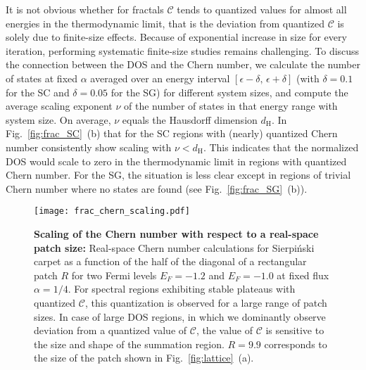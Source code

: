 {It is not obvious whether for fractals $\mathcal{C}$ tends to quantized values for almost all energies in the thermodynamic limit, that is the deviation from quantized $\mathcal{C}$ is solely due to finite-size effects. Because of exponential increase in size for every iteration, performing systematic finite-size studies remains challenging. To discuss the connection between the DOS and the Chern number,  we calculate the number of states at fixed $\alpha$ averaged over an energy interval $[\epsilon - \delta,\, \epsilon + \delta]$ (with $\delta = 0.1$ for the SC and $\delta = 0.05$ for the SG) for different system sizes, and compute the average scaling exponent $\nu$ of the number of states in that energy range with system size. On average, $\nu$ equals the Hausdorff dimension $d_{\mathrm{H}}$. In Fig.~\ref{fig:frac_SC}~(b) that for the SC regions with (nearly) quantized Chern number consistently show scaling with $\nu < d_{\mathrm{H}}$. This indicates that the normalized DOS would scale to zero in the thermodynamic limit in regions with quantized Chern number. For the SG, the situation is less clear except in regions of trivial Chern number where no states are found (see Fig.~\ref{fig:frac_SG}~(b)). 



\begin{figure}
\centering
\texttt{[image: frac\_chern\_scaling.pdf]}
\caption{\textbf{Scaling of the Chern number with respect to a real-space patch size:} Real-space Chern number calculations for Sierpiński carpet as a function of the half of the diagonal of a rectangular patch $R$ for two Fermi levels $E_F = -1.2$ and $E_F = -1.0$ at fixed flux $\alpha = 1/4$. For spectral regions exhibiting stable plateaus with quantized $\mathcal{C}$, this quantization is observed for a large range of patch sizes. In case of large DOS regions, in which we dominantly observe deviation from a quantized value of $\mathcal{C}$, the value of $\mathcal{C}$ is sensitive to the size and shape of the summation region. $R = 9.9$ corresponds to the size of the patch shown in Fig.~\ref{fig:lattice}~(a).}
\label{fig:ChernScaling}
\end{figure}

}
